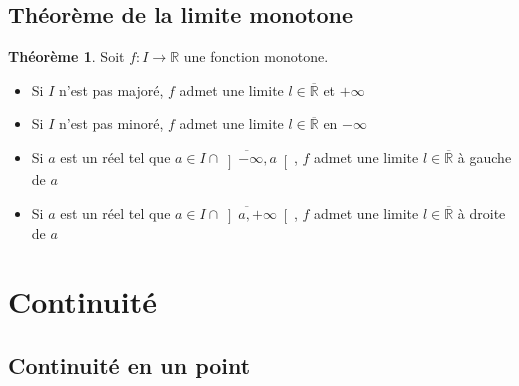\documentclass[10pt,a4paper]{article}
\theoremstyle{definition}
\newtheorem{theorem}[proposition]{Théorème}
\begin{document}
\subsection{Théorème de la limite monotone}
\begin{theorem}
Soit $f: I \to \mathbb{R}$ une fonction monotone.
\begin{itemize}
\item Si $I$ n'est pas majoré, $f$ admet une limite $l \in \overline{\mathbb{R}}$ et $+\infty$
\item Si $I$ n'est pas minoré, $f$ admet une limite $l \in \overline{\mathbb{R}}$ en $-\infty$
\item Si $a$ est un réel tel que $a \in \overline{I \cap \left]-\infty, a\right[}$, $f$ admet une limite $l \in \overline{\mathbb{R}}$ à gauche de $a$
\item Si $a$ est un réel tel que $a \in \overline{I \cap \left]a, +\infty\right[}$, $f$ admet une limite $l \in \overline{\mathbb{R}}$ à droite de $a$
\end{itemize}
\end{theorem}

\section{Continuité}
\subsection{Continuité en un point}
\end{document}
